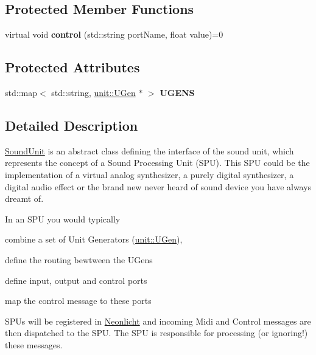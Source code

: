 \subsection*{Protected Member Functions}
\begin{DoxyCompactItemize}
\item 
virtual void {\bfseries control} (std\+::string port\+Name, float value)=0\hypertarget{classSoundUnit_a0a74ef3d6c9343f1ee64a9a96bdbbe78}{}\label{classSoundUnit_a0a74ef3d6c9343f1ee64a9a96bdbbe78}

\end{DoxyCompactItemize}
\subsection*{Protected Attributes}
\begin{DoxyCompactItemize}
\item 
std\+::map$<$ std\+::string, \hyperlink{classunit_1_1UGen}{unit\+::\+U\+Gen} $\ast$ $>$ {\bfseries U\+G\+E\+NS}\hypertarget{classSoundUnit_af89c0c537f05fde2f775dcaddc09bc3e}{}\label{classSoundUnit_af89c0c537f05fde2f775dcaddc09bc3e}

\end{DoxyCompactItemize}


\subsection{Detailed Description}
\hyperlink{classSoundUnit}{Sound\+Unit} is an abstract class defining the interface of the sound unit, which represents the concept of a Sound Processing Unit (S\+PU). This S\+PU could be the implementation of a virtual analog synthesizer, a purely digital synthesizer, a digital audio effect or the brand new never heard of sound device you have always dreamt of.

In an S\+PU you would typically


\begin{DoxyItemize}
\item combine a set of Unit Generators (\hyperlink{classunit_1_1UGen}{unit\+::\+U\+Gen}),
\item define the routing bewtween the U\+Gens
\item define input, output and control ports
\item map the control message to these ports
\end{DoxyItemize}

S\+P\+Us will be registered in \hyperlink{classNeonlicht}{Neonlicht} and incoming Midi and Control messages are then dispatched to the S\+PU. The S\+PU is responsible for processing (or ignoring!) these messages.

